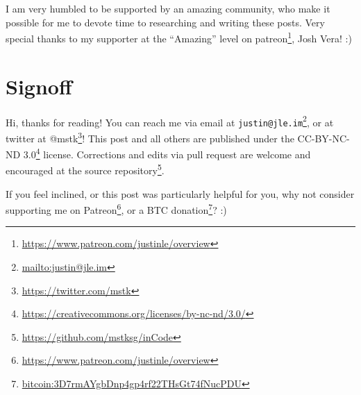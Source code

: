 \documentclass[]{article}
\renewcommand{\href}[2]{#2\footnote{\url{#1}}}
\begin{document}
I am very humbled to be supported by an amazing community, who make it possible
for me to devote time to researching and writing these posts. Very special
thanks to my supporter at the ``Amazing'' level on
\href{https://www.patreon.com/justinle/overview}{patreon}, Josh Vera! :)

\hypertarget{signoff}{%
\section{Signoff}\label{signoff}}

Hi, thanks for reading! You can reach me via email at
\href{mailto:justin@jle.im}{\nolinkurl{justin@jle.im}}, or at twitter at
\href{https://twitter.com/mstk}{@mstk}! This post and all others are published
under the \href{https://creativecommons.org/licenses/by-nc-nd/3.0/}{CC-BY-NC-ND
3.0} license. Corrections and edits via pull request are welcome and encouraged
at \href{https://github.com/mstksg/inCode}{the source repository}.

If you feel inclined, or this post was particularly helpful for you, why not
consider \href{https://www.patreon.com/justinle/overview}{supporting me on
Patreon}, or a \href{bitcoin:3D7rmAYgbDnp4gp4rf22THsGt74fNucPDU}{BTC donation}?
:)
\end{document}
